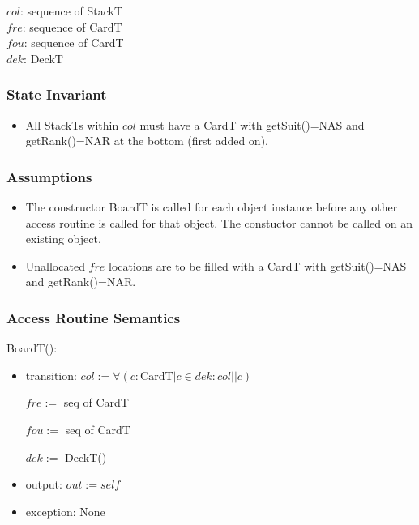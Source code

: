 \documentclass[12pt]{article}
\newcommand{\m}[1]{\mbox{#1}}
\begin{document}
$col$: sequence of StackT\\
$fre$: sequence of CardT\\
$fou$: sequence of CardT\\
$dek$: DeckT\\

\subsubsection* {State Invariant}

\begin{itemize}
  \item All StackTs within $col$ must have a CardT with getSuit()=\m{NAS}
  and getRank()=\m{NAR} at the bottom (first added on).
\end{itemize}

\subsubsection* {Assumptions}

\begin{itemize}
    \item The constructor BoardT is called for each object instance
    before any other access routine is called for that object. The
    constuctor cannot be called on an existing object.
    \item Unallocated $fre$ locations are to be filled with a CardT with
    getSuit()=\m{NAS} and getRank()=\m{NAR}.
\end{itemize}

\subsubsection* {Access Routine Semantics}

BoardT():
\begin{itemize}
    \item transition: $col := \forall(c : \mbox{CardT} | c \in dek : col||c)$

    \hspace{1.8cm} $fre :=$ seq of CardT

    \hspace{1.8cm} $fou :=$ seq of CardT

    \hspace{1.8cm} $dek :=$ DeckT()
    \item output: $out := \mathit{self}$
    \item exception: None
\end{itemize}
\end{document}
